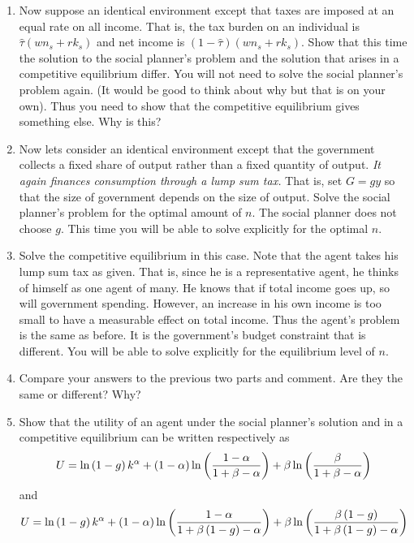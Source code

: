 \documentclass{article}
\begin{document}
\begin{enumerate}
\begin{enumerate}
\item Now suppose an identical environment except that taxes are imposed at
an equal rate on all income. That is, the tax burden on an individual is $%
\hat{\tau}\left( wn_{s}+rk_{s}\right) $ and net income is $\left( 1-\hat{\tau%
}\right) \left( wn_{s}+rk_{s}\right) .$ Show that this time the solution to
the social planner's problem and the solution that arises in a competitive
equilibrium differ. You will not need to solve the social planner's problem
again. (It would be good to think about why but that is on your own). Thus
you need to show that the competitive equilibrium gives something else. Why
is this?

\item Now lets consider an identical environment except that the government
collects a fixed share of output rather than a fixed quantity of output. 
\textit{It again finances consumption through a lump sum tax. }That is, set $%
G=gy$ so that the size of government depends on the size of output. Solve
the social planner's problem for the optimal amount of $n$. The social
planner does not choose $g$. This time you will be able to solve explicitly
for the optimal $n$.

\item Solve the competitive equilibrium in this case. Note that the agent
takes his lump sum tax as given. That is, since he is a representative
agent, he thinks of himself as one agent of many. He knows that if total
income goes up, so will government spending. However, an increase in his own
income is too small to have a measurable effect on total income. Thus the
agent's problem is the same as before. It is the government's budget
constraint that is different. You will be able to solve explicitly for the
equilibrium level of $n$.

\item Compare your answers to the previous two parts and comment. Are they
the same or different? Why?

\item Show that the utility of an agent under the social planner's solution
and in a competitive equilibrium can be written respectively as 
\begin{equation}
U=\ln \left( 1-g\right) k^{\alpha }+\left( 1-\alpha \right) \ln \left( \frac{%
1-\alpha }{1+\beta -\alpha }\right) +\beta \ln \left( \frac{\beta }{1+\beta
-\alpha }\right)  \label{a}
\end{equation}%
and%
\begin{equation}
U=\ln \left( 1-g\right) k^{\alpha }+\left( 1-\alpha \right) \ln \left( \frac{%
1-\alpha }{1+\beta \left( 1-g\right) -\alpha }\right) +\beta \ln \left( 
\frac{\beta \left( 1-g\right) }{1+\beta \left( 1-g\right) -\alpha }\right)
\label{b}
\end{equation}


\end{enumerate}
\end{enumerate}
\end{document}
